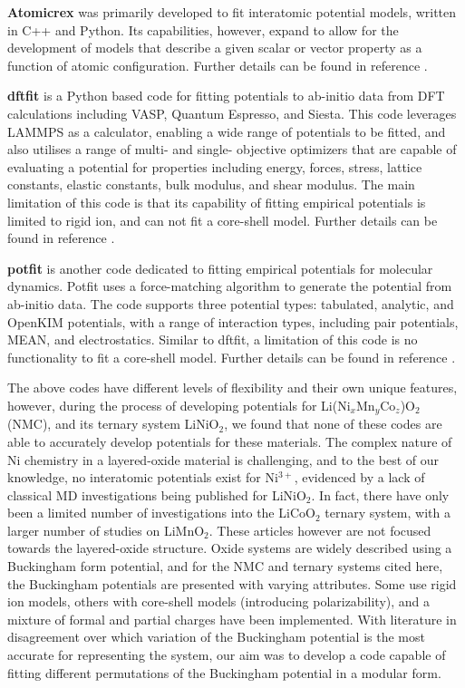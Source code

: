 \documentclass[journal=jacsat,manuscript=article]{achemso}
\begin{document}
\textbf{Atomicrex} was primarily developed to fit interatomic potential models, written in C++ and Python.\cite{Stukowski_2017} Its capabilities, however, expand to allow for the development of models that describe a given scalar or vector property as a function of atomic configuration. Further details can be found in reference .

\textbf{dftfit} is a Python based code for fitting potentials to ab-initio data from DFT calculations including VASP, Quantum Espresso, and Siesta. This code leverages LAMMPS as a calculator, enabling a wide range of potentials to be fitted, and also utilises a range of multi- and single- objective optimizers that are capable of evaluating a potential for properties including energy, forces, stress, lattice constants, elastic constants, bulk modulus, and shear modulus. The main limitation of this code is that its capability of fitting empirical potentials is limited to rigid ion, and can not fit a core-shell model. Further details can be found in reference .

\textbf{potfit} is another code dedicated to fitting empirical potentials for molecular dynamics. \cite{wen_kim-compliant_2017} Potfit uses a force-matching algorithm to generate the potential from ab-initio data. The code supports three potential types: tabulated, analytic, and OpenKIM potentials, with a range of interaction types, including pair potentials, MEAN, and electrostatics. Similar to dftfit, a limitation of this code is no functionality to fit a core-shell model. Further details can be found in reference .

The above codes have different levels of flexibility and their own unique features, however, during the process of developing potentials for Li(Ni$_x$Mn$_y$Co$_z$)O$_2$ (NMC), and its ternary system LiNiO$_2$, we found that none of these codes are able to accurately develop potentials for these materials. The complex nature of Ni chemistry in a layered-oxide material is challenging, and to the best of our knowledge, no interatomic potentials exist for Ni$^{3+}$, evidenced by a lack of classical MD investigations being published for LiNiO$_2$. In fact, there have only been a limited number of investigations into the LiCoO$_2$ ternary system,\cite{He2019,Hart1998,Fisher2010, Lewis_1985} with a larger number of studies on LiMnO$_2$.\cite{Ledwaba2020, Sayle2005,Ammundsen1999,Dawson0214, Kerisit2014} These articles however are not focused towards the layered-oxide structure. Oxide systems are widely described using a Buckingham form potential, and for the NMC and ternary systems cited here, the Buckingham potentials are presented with varying attributes. Some use rigid ion models, others with core-shell models (introducing polarizability), and a mixture of formal and partial charges have been implemented. With literature in disagreement over which variation of the Buckingham potential is the most accurate for representing the system, our aim was to develop a code capable of fitting different permutations of the Buckingham potential in a modular form.
\end{document}

